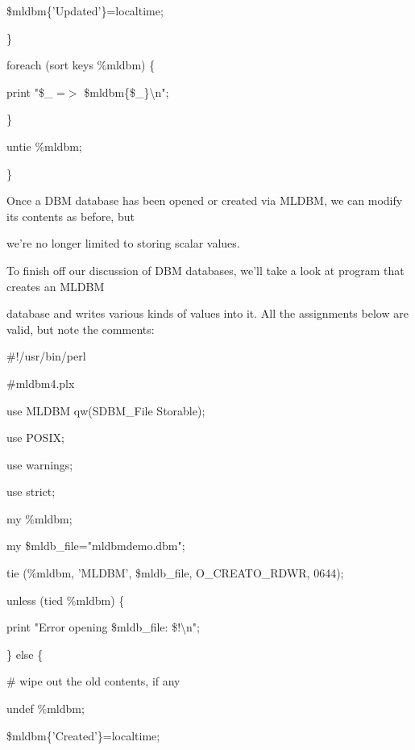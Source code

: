 \documentclass[a4paper,11pt]{book}
\begin{document}
\noindent \$mldbm\{'Updated'\}=localtime;

\noindent \}

\noindent foreach (sort keys \%mldbm) \{

\noindent print "\$\_  =$>$ \$mldbm\{\$\_\}\textbackslash n";

\noindent \}

\noindent untie \%mldbm;

\noindent \}

\noindent 

\noindent Once a DBM database has been opened or created via MLDBM, we can modify its contents as before, but

\noindent we're no longer limited to storing scalar values.

\noindent 

\noindent 

\noindent To  finish off our  discussion of  DBM  databases,  we'll  take  a  look  at  program  that  creates  an  MLDBM

\noindent database and writes various kinds  of  values  into  it.  All  the  assignments  below  are valid,  but  note the comments:

\noindent 

\noindent \#!/usr/bin/perl

\noindent \#mldbm4.plx

\noindent use MLDBM qw(SDBM\_File Storable);

\noindent use POSIX;

\noindent use warnings;

\noindent use strict;

\noindent 

\noindent my \%mldbm;

\noindent my \$mldb\_file="mldbmdemo.dbm";

\noindent 

\noindent tie (\%mldbm, 'MLDBM', \$mldb\_file, O\_CREAT\textbar O\_RDWR, 0644);

\noindent 

\noindent unless (tied \%mldbm) \{

\noindent print "Error opening \$mldb\_file: \$!\textbackslash n";

\noindent \} else \{

\noindent \# wipe out the old contents, if any

\noindent undef \%mldbm;

\noindent 

\noindent \$mldbm\{'Created'\}=localtime;
\end{document}
